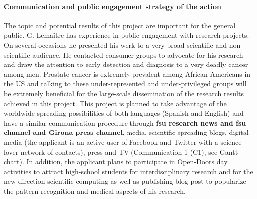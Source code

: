 \paragraph{Communication and public engagement strategy of the action}
The topic and potential results of this project are important for the general public.
G. Lema\^itre has experience in public engagement with research projects.
On several occasions he presented his work to a very broad scientific and non-scientific audience.
He contacted consumer groups to advocate for his research and draw the attention to early detection and diagnosis to a very deadly cancer among men.
Prostate cancer is extremely prevalent among African Americans in the US and talking to these under-represented and under-privileged groups will be extremely beneficial for the large-scale dissemination of the research results achieved in this project.
This project is planned to take advantage of the worldwide spreading possibilities of both languages (Spanish and English) and have a similar communication procedure through \textbf{\ac{fsu} research news and \ac{fsu} channel and Girona press channel}, media, scientific-spreading blogs, digital media (the applicant is an active user of Facebook and Twitter with a science-lover network of contacts), press and TV (Communication 1 (C1), see Gantt chart).
In addition, the applicant plans to participate in Open-Doors day activities to attract high-school students for interdisciplinary research and for the new direction scientific computing as well as publishing blog post to popularize the pattern recognition and medical aspects of his research.

